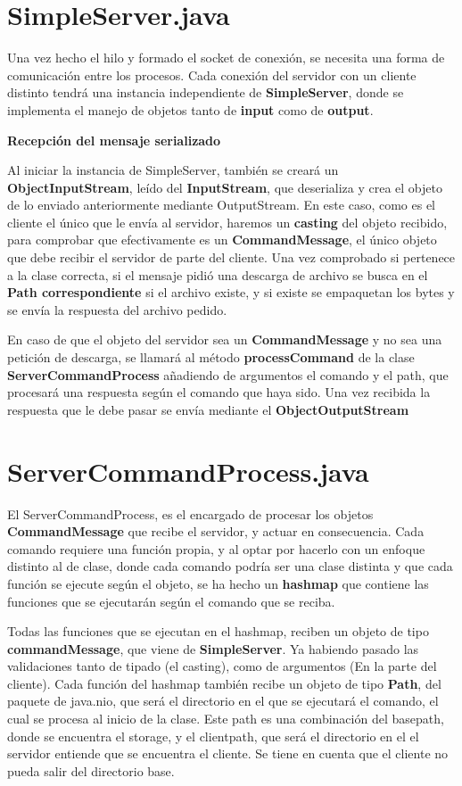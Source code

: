 \documentclass[a4paper, 12pt]{report}
\begin{document}
\section{SimpleServer.java}

Una vez hecho el hilo y formado el socket de conexión, se necesita una forma de comunicación entre los procesos. Cada conexión del servidor con un cliente distinto tendrá una instancia independiente de \textbf{SimpleServer}, donde se implementa el manejo de objetos tanto de \textbf{input} como de \textbf{output}.

\textbf{Recepción del mensaje serializado}

Al iniciar la instancia de SimpleServer, también se creará un \textbf{ObjectInputStream}, leído del \textbf{InputStream}, que deserializa y crea el objeto de lo enviado anteriormente mediante OutputStream.
En este caso, como es el cliente el único que le envía al servidor, haremos un \textbf{casting} del objeto recibido, para comprobar que efectivamente es un \textbf{CommandMessage}, el único objeto que debe recibir el servidor de parte del cliente. Una vez comprobado si pertenece a la clase correcta, si el mensaje pidió una descarga de archivo se busca en el \textbf{Path correspondiente} si el archivo existe, y si existe se empaquetan los bytes y se envía la respuesta del archivo pedido.

En caso de que el objeto del servidor sea un \textbf{CommandMessage} y no sea una petición de descarga, se llamará al método \textbf{processCommand} de la clase \textbf{ServerCommandProcess} añadiendo de argumentos el comando y el path, que procesará una respuesta según el comando que haya sido. Una vez recibida la respuesta que le debe pasar se envía mediante el \textbf{ObjectOutputStream}

\section{ServerCommandProcess.java}

El ServerCommandProcess, es el encargado de procesar los objetos \textbf{CommandMessage} que recibe el
servidor, y actuar en consecuencia. Cada comando requiere una función propia, y al optar
por hacerlo con un enfoque distinto al de clase, donde cada comando podría ser una clase distinta y que cada
función se ejecute según el objeto, se ha hecho un \textbf{hashmap} que contiene las funciones que se ejecutarán
según el comando que se reciba.

Todas las funciones que se ejecutan en el hashmap, reciben un objeto de tipo \textbf{commandMessage},
que viene de \textbf{SimpleServer}. Ya habiendo pasado las validaciones tanto de tipado (el casting),
como de argumentos (En la parte del cliente). Cada función del hashmap también recibe un objeto de tipo
\textbf{Path}, del paquete de java.nio, que será el directorio en el que se ejecutará el comando, el cual se
procesa al inicio de la clase. Este path es una combinación del basepath, donde se encuentra el storage, y el
clientpath, que será el directorio en el el servidor entiende que se encuentra el cliente.
Se tiene en cuenta que el cliente no pueda salir del directorio base.
\end{document}
